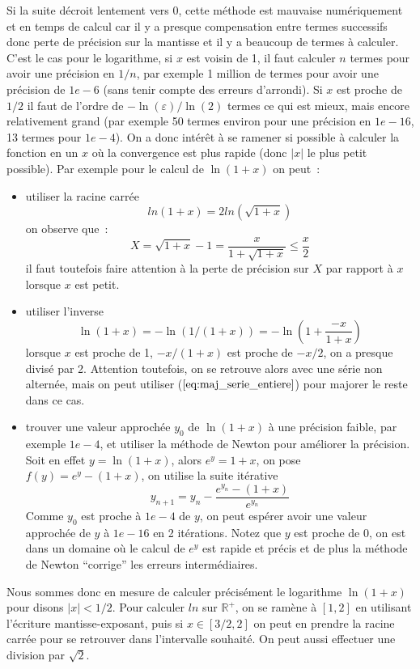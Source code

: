 \documentclass[a4paper,11pt]{book}
\begin{document}
\begin{giacjshere}
Si la suite d\'ecroit lentement vers 0, cette m\'ethode est
mauvaise num\'eriquement et en temps de calcul
car il y a presque compensation entre
termes successifs donc perte de pr\'ecision sur la mantisse et il
y a beaucoup de termes \`a calculer. C'est le cas pour le logarithme,
si $x$ est voisin de 1, il faut calculer $n$ termes pour avoir une
pr\'ecision en $1/n$, par exemple 1 million de termes pour avoir
une pr\'ecision de $1e-6$ (sans tenir compte des erreurs d'arrondi). 
Si $x$ est proche de $1/2$ il faut de l'ordre
de $-\ln(\varepsilon)/\ln(2)$ termes ce qui est mieux, mais encore
relativement grand (par exemple
50 termes environ pour une pr\'ecision en $1e-16$,
13 termes pour $1e-4$).
On a donc int\'er\^et \`a se
ramener si possible \`a calculer la fonction en un $x$ o\`u la
convergence est plus rapide (donc $|x|$ le plus petit possible).
Par exemple pour le calcul de $\ln(1+x)$ on peut~:
\begin{itemize}
\item utiliser la racine carr\'ee
\[ ln(1+x)= 2 ln(\sqrt{1+x})\]
on observe que~:
\[ X=\sqrt{1+x}-1 = \frac{x}{1+\sqrt{1+x}} \leq \frac{x}{2} \]
il faut toutefois faire attention \`a la perte de pr\'ecision sur
$X$ par rapport \`a $x$ lorsque $x$ est petit.
\item utiliser l'inverse
\[ \ln(1+x)=-\ln(1/(1+x))=-\ln(1 + \frac{-x}{1+x}) \]
lorsque $x$ est proche de 1, $-x/(1+x)$ est proche de $-x/2$, on
a presque divis\'e par 2. Attention toutefois, on se retrouve alors
avec une s\'erie non altern\'ee, mais on peut utiliser 
(\(\ref{eq:maj_serie_entiere}\)) pour majorer le reste dans ce cas.
\item trouver une valeur approch\'ee $y_0$ de $\ln(1+x)$ \`a une pr\'ecision
faible, par exemple $1e-4$, et utiliser la m\'ethode de Newton pour
am\'eliorer la pr\'ecision. Soit en effet $y=\ln(1+x)$, alors
$e^y=1+x$, on pose $f(y)=e^y-(1+x)$, on utilise la suite it\'erative
\[ y_{n+1} = y_n - \frac{e^{y_n}-(1+x)}{e^{y_n}}  \]
Comme $y_0$ est proche \`a $1e-4$ de $y$, on peut esp\'erer avoir
une valeur approch\'ee de $y$ \`a $1e-16$ en 2 it\'erations. Notez
que $y$ est proche de $0$, on est dans un domaine o\`u le calcul
de $e^y$ est rapide et pr\'ecis et de plus la m\'ethode de Newton
``corrige'' les erreurs interm\'ediaires.
\end{itemize}

Nous sommes donc en mesure de calculer pr\'ecis\'ement le logarithme
$\ln(1+x)$ pour disons $|x|<1/2$. Pour calculer $ln$ sur $\mathbb{R}^+$,
on se ram\`ene \`a $[1,2]$ en utilisant l'\'ecriture
mantisse-exposant, puis si $x\in[3/2,2]$ on peut en prendre la racine
carr\'ee pour se retrouver dans l'intervalle souhait\'e.
On peut aussi effectuer une division par $\sqrt{2}$.


\end{giacjshere}
\end{document}

